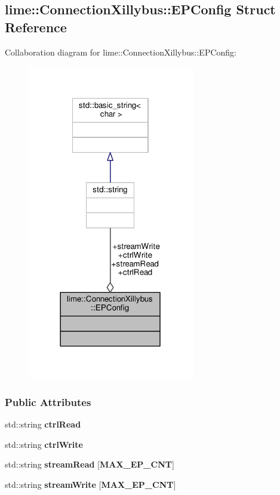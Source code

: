 \subsection{lime\+:\+:Connection\+Xillybus\+:\+:E\+P\+Config Struct Reference}
\label{structlime_1_1ConnectionXillybus_1_1EPConfig}


Collaboration diagram for lime\+:\+:Connection\+Xillybus\+:\+:E\+P\+Config\+:
\nopagebreak
\begin{figure}[H]
\begin{center}
\leavevmode
\includegraphics[width=206pt]{d8/d20/structlime_1_1ConnectionXillybus_1_1EPConfig__coll__graph}
\end{center}
\end{figure}
\subsubsection*{Public Attributes}
\begin{DoxyCompactItemize}
\item 
std\+::string {\bf ctrl\+Read}
\item 
std\+::string {\bf ctrl\+Write}
\item 
std\+::string {\bf stream\+Read} [{\bf M\+A\+X\+\_\+\+E\+P\+\_\+\+C\+NT}]
\item 
std\+::string {\bf stream\+Write} [{\bf M\+A\+X\+\_\+\+E\+P\+\_\+\+C\+NT}]
\end{DoxyCompactItemize}


